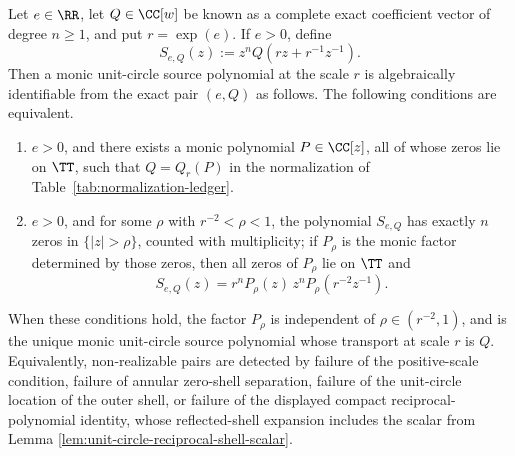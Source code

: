 \begin{theorem}\label{thm:intrinsic-leyang-shell-recognition}
Let \(e\in\RR\), let \(Q\in\CC[w]\) be known as a complete exact coefficient vector of degree \(n\ge1\), and put \(r=\exp(e)\).  If \(e>0\), define
\[
S_{e,Q}(z):=z^nQ\!\left(rz+r^{-1}z^{-1}\right).
\]
Then a monic unit-circle source polynomial at the scale \(r\) is algebraically identifiable from the exact pair \((e,Q)\) as follows.  The following conditions are equivalent.
\begin{enumerate}[label=\textup{(\roman*)}]
\item \(e>0\), and there exists a monic polynomial \(P\in\CC[z]\), all of whose zeros lie on \(\TT\), such that \(Q=Q_r(P)\) in the normalization of Table~\ref{tab:normalization-ledger}.
\item \(e>0\), and for some \(\rho\) with \(r^{-2}<\rho<1\), the polynomial \(S_{e,Q}\) has exactly \(n\) zeros in \(\{|z|>\rho\}\), counted with multiplicity; if \(P_\rho\) is the monic factor determined by those zeros, then all zeros of \(P_\rho\) lie on \(\TT\) and
\[
\boxed{\;
S_{e,Q}(z)=r^n P_\rho(z)\,z^nP_\rho\!\left(r^{-2}z^{-1}\right).
\;}
\]
\end{enumerate}
When these conditions hold, the factor \(P_\rho\) is independent of \(\rho\in(r^{-2},1)\), and is the unique monic unit-circle source polynomial whose transport at scale \(r\) is \(Q\).  Equivalently, non-realizable pairs are detected by failure of the positive-scale condition, failure of annular zero-shell separation, failure of the unit-circle location of the outer shell, or failure of the displayed compact reciprocal-polynomial identity, whose reflected-shell expansion includes the scalar from Lemma \ref{lem:unit-circle-reciprocal-shell-scalar}.
\end{theorem}

